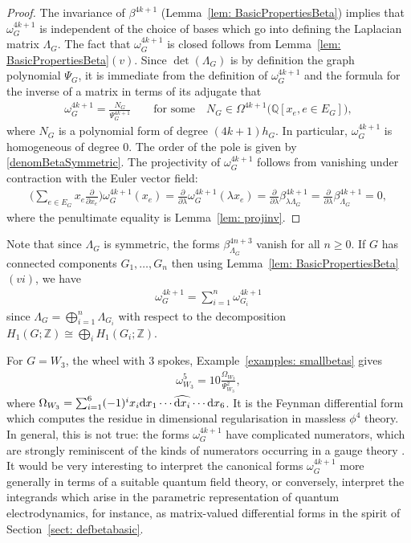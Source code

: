 \documentclass[pdftex]{sigma}%
\numberwithin{equation}{section}
\newcommand{\Z}{\mathbb Z}
\newcommand{\Q}{\mathbb Q}
\newcommand{\0}{\color{blue}{\mathsf{0}}}
\begin{document}
\begin{proof}
The invariance of $\beta^{4k+1}$ (Lemma~\ref{lem: BasicPropertiesBeta}) implies that $\omega^{4k+1}_G$ is independent of the choice of bases which go into defining the Laplacian matrix $\Lambda_G$. The fact that $\omega^{4k+1}_G$ is closed follows from Lemma~\ref{lem: BasicPropertiesBeta}$(v)$.
 Since $\det(\Lambda_G)$ is by definition the graph polynomial $\Psi_G$, it is immediate from the definition of $\omega^{4k+1}_G$ and the formula for the inverse of a matrix in terms of its adjugate that
\begin{gather*}
\omega^{4k+1}_G = \frac{ N_G }{\Psi_G^{4k+1}} \qquad \text{for some} \quad
N_G \in \Omega^{4k+1}\big(\Q[x_e, e\in E_G]\big),
\end{gather*}
 where $N_G$ is a polynomial form of degree $(4k+1)h_G$. In particular, $\omega^{4k+1}_G$ is homogeneous of degree $0$. The order of the pole is given by \eqref{denomBetaSymmetric}.
 The projectivity of $\omega^{4k+1}_G$ follows from vanishing under contraction with the Euler vector field:
 \begin{gather*}
 \bigg(\sum_{e\in E_G} x_e \frac{\partial}{\partial x_e}\bigg) \omega^{4k+1}_{G}(x_e) = \frac{\partial}{\partial \lambda} \omega^{4k+1}_G( \lambda x_e) = \frac{\partial}{\partial \lambda} \beta^{4k+1}_{\lambda \Lambda_G} = \frac{\partial}{\partial \lambda} \beta^{4k+1}_{\Lambda_G}=0,
 \end{gather*}
 where the penultimate equality is Lemma~\ref{lem: projinv}.
\end{proof}

Note that since $\Lambda_G$ is symmetric, the forms $\beta^{4n+3}_{\Lambda_G}$ vanish for all $n\geq 0$. If $G$ has connected components $G_1,\dots, G_n$ then using Lemma~\ref{lem: BasicPropertiesBeta}$(vi)$, we have
\begin{gather*}
\omega^{4k+1}_{G} = \sum_{i=1}^n \omega^{4k+1}_{G_i}
\end{gather*}
since $\Lambda_G = \bigoplus_{i=1}^n \Lambda_{G_i}$ with respect to the decomposition $H_1(G;\Z) \cong \bigoplus_{i} H_1(G_i;\Z)$.

\begin{Example} \label{example: W3form} For $G= W_3$, the wheel with 3 spokes, Example~\ref{examples: smallbetas} gives
\begin{gather*}
\omega^5_{W_3} = 10 \frac{\Omega_{W_3}} {\Psi_{W_3}^2},
\end{gather*}
where $\Omega_{W_3} = \sum_{i=1}^6 (-1)^i x_i {\rm d}x_1 \cdots \widehat{{\rm d}x_i} \cdots {\rm d}x_6$. It is the Feynman differential form which computes the residue in dimensional regularisation in massless $\phi^4$ theory. In general, this is not true: the forms $\omega^{4k+1}_G$ have complicated numerators, which are strongly reminiscent of the kinds of numerators occurring in a gauge theory \cite{Golz}. It would be very interesting to interpret the canonical forms $\omega^{4k+1}_G$ more generally in terms of a suitable quantum field theory, or conversely, interpret the integrands which arise in the parametric representation of quantum electrodynamics, for instance, as matrix-valued differential forms in the spirit of Section~\ref{sect: defbetabasic}.
\end{Example}
\end{document}
